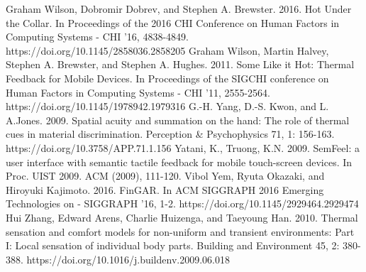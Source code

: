 \documentclass[preprint,12pt]{elsarticle}
\begin{document}
\begin{thebibliography}{00}
Graham Wilson, Dobromir Dobrev, and Stephen A. Brewster. 2016. Hot Under the Collar. In Proceedings of the 2016 CHI Conference on Human Factors in Computing Systems - CHI '16, 4838-4849. https://doi.org/10.1145/2858036.2858205
Graham Wilson, Martin Halvey, Stephen A. Brewster, and Stephen A. Hughes. 2011. Some Like it Hot: Thermal Feedback for Mobile Devices. In Proceedings of the SIGCHI conference on Human Factors in Computing Systems - CHI '11, 2555-2564. https://doi.org/10.1145/1978942.1979316
G.-H. Yang, D.-S. Kwon, and L. A.Jones. 2009. Spatial acuity and summation on the hand: The role of thermal cues in material discrimination. Perception \& Psychophysics 71, 1: 156-163. https://doi.org/10.3758/APP.71.1.156
Yatani, K., Truong, K.N. 2009. SemFeel: a user interface with semantic tactile feedback for mobile touch-screen devices. In Proc. UIST 2009. ACM (2009), 111-120.
Vibol Yem, Ryuta Okazaki, and Hiroyuki Kajimoto. 2016. FinGAR. In ACM SIGGRAPH 2016 Emerging Technologies on - SIGGRAPH '16, 1-2. https://doi.org/10.1145/2929464.2929474
Hui Zhang, Edward Arens, Charlie Huizenga, and Taeyoung Han. 2010. Thermal sensation and comfort models for non-uniform and transient environments: Part I: Local sensation of individual body parts. Building and Environment 45, 2: 380-388. https://doi.org/10.1016/j.buildenv.2009.06.018


\end{thebibliography}
\end{document}
